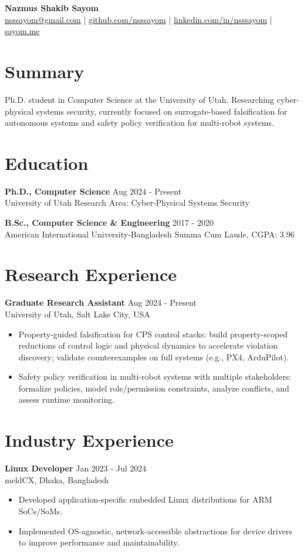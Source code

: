 \documentclass[10pt,letterpaper]{article}
\newcommand{\sep}{\;\textcolor{headgray}{|}\;}
\begin{document}
\begin{center}
{\LARGE \bfseries Nazmus Shakib Sayom}\\[4pt]
\normalsize
\href{mailto:nsssayom@gmail.com}{nsssayom@gmail.com} \sep
\href{https://github.com/nsssayom}{github.com/nsssayom} \sep
\href{https://www.linkedin.com/in/nsssayom/}{linkedin.com/in/nsssayom} \sep
\href{https://sayom.me/}{sayom.me}
\end{center}

\section*{Summary}
Ph.D. student in Computer Science at the University of Utah. Researching cyber-physical systems security, currently focused on surrogate-based falsification for autonomous systems and safety policy verification for multi-robot systems.

\section*{Education}
\textbf{Ph.D., Computer Science} \hfill Aug 2024 - Present\\
University of Utah \hfill Research Area: Cyber-Physical Systems Security

\textbf{B.Sc., Computer Science \& Engineering} \hfill 2017 - 2020\\
American International University-Bangladesh \hfill Summa Cum Laude, CGPA: 3.96

\section*{Research Experience}
\textbf{Graduate Research Assistant} \hfill Aug 2024 - Present\\
University of Utah, Salt Lake City, USA
\begin{itemize}
  \item Property-guided falsification for CPS control stacks: build property-scoped reductions of control logic and physical dynamics to accelerate violation discovery; validate counterexamples on full systems (e.g., PX4, ArduPilot).
  \item Safety policy verification in multi-robot systems with multiple stakeholders: formalize policies, model role/permission constraints, analyze conflicts, and assess runtime monitoring.
\end{itemize}

\section*{Industry Experience}
\textbf{Linux Developer} \hfill Jan 2023 - Jul 2024\\
meldCX, Dhaka, Bangladesh
\begin{itemize}
  \item Developed application-specific embedded Linux distributions for ARM SoCs/SoMs.
  \item Implemented OS-agnostic, network-accessible abstractions for device drivers to improve performance and maintainability.
\end{itemize}
\end{document}
